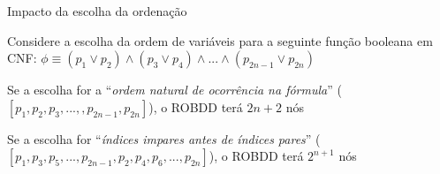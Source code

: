 \expandafter\documentclass\expandafter[table, usenames, svgnames, dvipsnames,14pt, \classopts]{beamer}
\begin{document}
\begin{frame}{Impacto da escolha da ordenação}

    Considere a escolha da ordem de variáveis para a seguinte função booleana em CNF:
    $\phi \equiv (p_1 \lor p_2) \land (p_3 \lor p_4) \land ... \land (p_{2n-1} \lor p_{2n})$

    \begin{outline}
        \small
        \1 Se a escolha for a ``\textit{ordem natural de ocorrência na fórmula}'' ($[p_1,p_2,p_3,...,,p_{2n-1},p_{2n}]$), o ROBDD terá $2n+2$ nós
        
        \vspace{1em}
        
        \1 Se a escolha for ``\textit{índices impares antes de índices pares}'' ($[p_1,p_3,p_5,...,p_{2n-1},p_2,p_4,p_6,...,p_{2n}]$), o ROBDD terá $2^{n+1}$ nós
    \end{outline}
    
\end{frame}
\end{document}
